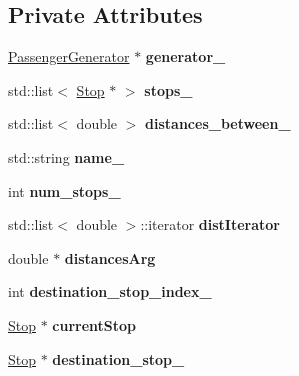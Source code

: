 \subsection*{Private Attributes}
\begin{DoxyCompactItemize}
\item 
\mbox{\label{classRoute_abb0d4a5df9055df459fb5f0b7ae2810e}} 
\hyperlink{classPassengerGenerator}{Passenger\+Generator} $\ast$ {\bfseries generator\+\_\+}
\item 
\mbox{\label{classRoute_a29357cad3848e8a3ff4dae57610968ee}} 
std\+::list$<$ \hyperlink{classStop}{Stop} $\ast$ $>$ {\bfseries stops\+\_\+}
\item 
\mbox{\label{classRoute_a307fe2f7f06105f4f3ae7172264fbcd7}} 
std\+::list$<$ double $>$ {\bfseries distances\+\_\+between\+\_\+}
\item 
\mbox{\label{classRoute_a89cf21e933b4599c2fa6dd21728539d9}} 
std\+::string {\bfseries name\+\_\+}
\item 
\mbox{\label{classRoute_ac54981fe7329c32eccbeaea86f7a62f1}} 
int {\bfseries num\+\_\+stops\+\_\+}
\item 
\mbox{\label{classRoute_aabece44a610bc4a061874026967ffe6a}} 
std\+::list$<$ double $>$\+::iterator {\bfseries dist\+Iterator}
\item 
\mbox{\label{classRoute_a99f011e6dbc9d6047edb5fc162b2bc05}} 
double $\ast$ {\bfseries distances\+Arg}
\item 
\mbox{\label{classRoute_aac90998d2c10aa08885436874fb840f2}} 
int {\bfseries destination\+\_\+stop\+\_\+index\+\_\+}
\item 
\mbox{\label{classRoute_a5fea644d7493765558418a8f9fe29aa5}} 
\hyperlink{classStop}{Stop} $\ast$ {\bfseries current\+Stop}
\item 
\mbox{\label{classRoute_af702077267c252eae57caa0439b46f94}} 
\hyperlink{classStop}{Stop} $\ast$ {\bfseries destination\+\_\+stop\+\_\+}
\end{DoxyCompactItemize}



